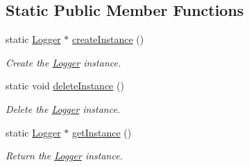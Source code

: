 \subsection*{Static Public Member Functions}
\begin{DoxyCompactItemize}
\item 
static \hyperlink{classzbe_1_1_logger}{Logger} $\ast$ \hyperlink{classzbe_1_1_logger_a7b2bb1e235789bfdb3a316855c8437f5}{create\+Instance} ()
\begin{DoxyCompactList}\small\item\em Create the \hyperlink{classzbe_1_1_logger}{Logger} instance. \end{DoxyCompactList}\item 
static void \hyperlink{classzbe_1_1_logger_a801cea12a6f29be41970d829028cdb0b}{delete\+Instance} ()
\begin{DoxyCompactList}\small\item\em Delete the \hyperlink{classzbe_1_1_logger}{Logger} instance. \end{DoxyCompactList}\item 
static \hyperlink{classzbe_1_1_logger}{Logger} $\ast$ \hyperlink{classzbe_1_1_logger_a204f4b2d23f94701995885d4ffc4bc70}{get\+Instance} ()
\begin{DoxyCompactList}\small\item\em Return the \hyperlink{classzbe_1_1_logger}{Logger} instance. \end{DoxyCompactList}\end{DoxyCompactItemize}
